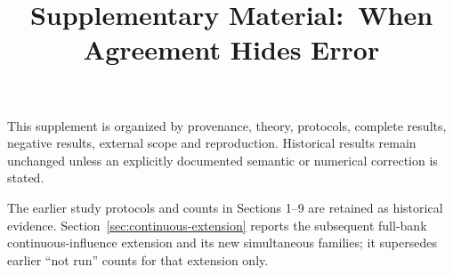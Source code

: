\documentclass[10pt,twocolumn,letterpaper]{article}
\title{Supplementary Material:\
When Agreement Hides Error}
\begin{document}
\maketitle
\raggedbottom
This supplement is organized by provenance, theory, protocols, complete results, negative results, external scope and reproduction. Historical results remain unchanged unless an explicitly documented semantic or numerical correction is stated.\par
The earlier study protocols and counts in Sections 1--9 are retained as historical evidence. Section~\ref{sec:continuous-extension} reports the subsequent full-bank continuous-influence extension and its new simultaneous families; it supersedes earlier ``not run'' counts for that extension only.\par



\clearpage

\clearpage
\clearpage

\clearpage


\clearpage

\clearpage
\end{document}
